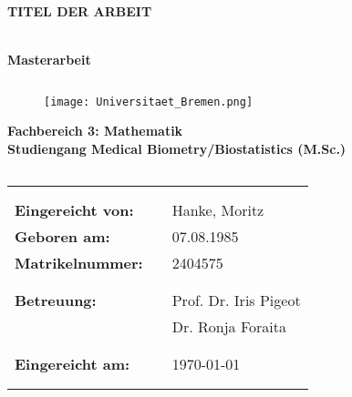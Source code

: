 \documentclass[12pt, a4paper]{report}
\begin{document}
\thispagestyle{empty}

\begin{center}
\textbf{\LARGE{TITEL DER ARBEIT\\}} 
\end{center}

\begin{center}
\textbf{\Large{\\Masterarbeit}}
\end{center}
\begin{verbatim}

\end{verbatim}

\begin{figure}[htbp]
\begin{center}
\texttt{[image: Universitaet\_Bremen.png]}
\end{center}
\end{figure}

\begin{center}
\textbf{Fachbereich 3: Mathematik \\
Studiengang Medical Biometry/Biostatistics (M.Sc.)\\}
\end{center}
\begin{verbatim}

\end{verbatim}

\begin{flushleft}
\begin{tabular}{lll}
& & \\
& & \\
\textbf{Eingereicht von:} & & Hanke, Moritz \\
\textbf{Geboren am:} & & 07.08.1985 \\
\textbf{Matrikelnummer:} & & 2404575 \\
& & \\
& & \\
\textbf{Betreuung:} & & Prof. Dr. Iris Pigeot\\
& & Dr. Ronja Foraita \\
& & \\
& & \\
\textbf{Eingereicht am:} & & \today\\
& & \\
& & \\
\end{tabular}
\end{flushleft}
\end{document}
